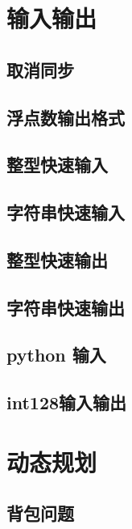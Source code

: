 \chapter{输入输出}
\section{取消同步}
\raggedbottom
\hrulefill
\section{浮点数输出格式}
\raggedbottom
\hrulefill
\section{整型快速输入}
\raggedbottom
\hrulefill
\section{字符串快速输入}
\raggedbottom
\hrulefill
\section{整型快速输出}
\raggedbottom
\hrulefill
\section{字符串快速输出}
\raggedbottom
\hrulefill
\section{python 输入}
\raggedbottom
\hrulefill
\section{int128输入输出}
\raggedbottom
\hrulefill

\chapter{动态规划}
\section{背包问题}
\raggedbottom
\hrulefill

